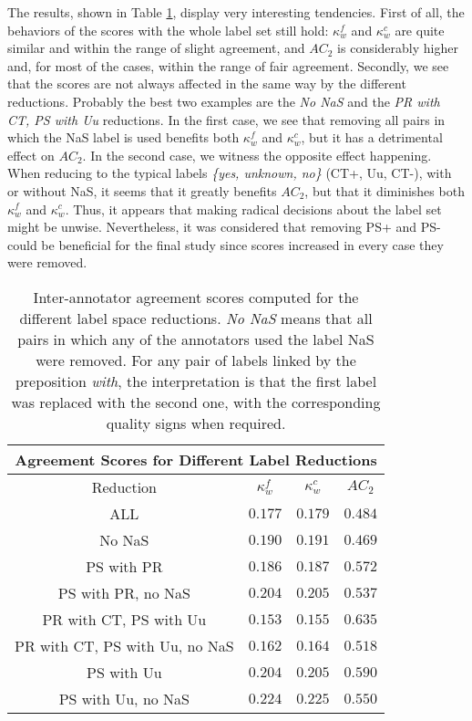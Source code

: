 The results, shown in Table \ref{tab:rediaa}, display very interesting tendencies. First of all, the behaviors of the scores with the whole label set still hold: $\kappa^{f}_{w}$ and $\kappa^{c}_{w}$ are quite similar and within the range of slight agreement, and $AC_2$ is considerably higher and, for most of the cases, within the range of fair agreement. Secondly, we see that the scores are not always affected in the same way by the different reductions. Probably the best two examples are the \textit{No NaS} and the \textit{PR with CT, PS with Uu} reductions. In the first case, we see that removing all pairs in which the NaS label is used benefits both $\kappa^{f}_{w}$ and $\kappa^{c}_{w}$, but it has a detrimental effect on $AC_2$. In the second case, we witness the opposite effect happening. When reducing to the typical labels \textit{\{yes, unknown, no\}} (CT+, Uu, CT-), with or without NaS, it seems that it greatly benefits $AC_2$, but that it diminishes both $\kappa^{f}_{w}$ and $\kappa^{c}_{w}$. Thus, it appears that making radical decisions about the label set might be unwise. Nevertheless, it was considered that removing PS+ and PS- could be beneficial for the final study since scores increased in every case they were removed.\\

\begin{table}
\centering
\begin{tabular}{|c|c|c|c|}
\hline
\multicolumn{4}{|c|}{Agreement Scores for Different Label Reductions}\\\hline
Reduction &  $\kappa^{f}_{w}$ & $\kappa^{c}_{w}$ & $AC_2$\\\hline
ALL & $0.177$ & $0.179$ & $0.484$\\\hline
No NaS & $0.190$ & $0.191$ & $0.469$ \\\hline
PS with PR & $0.186$ & $0.187$ & $0.572$\\\hline
PS with PR, no NaS & $0.204$ & $0.205$ & $0.537$\\\hline
PR with CT, PS with Uu & $0.153$ & $0.155$ & $0.635$\\\hline
PR with CT, PS with Uu, no NaS & $0.162$ & $0.164$ & $0.518$\\\hline
PS with Uu & $0.204$ & $0.205$ & $0.590$\\\hline
PS with Uu, no NaS & $0.224$ & $0.225$ & $0.550$\\\hline 
\end{tabular}
\caption[Inter-annotator agreement scores for different label reductions.]{Inter-annotator agreement scores computed for the different label space reductions. \textit{No NaS} means that all pairs in which any of the annotators used the label NaS were removed. For any pair of labels linked by the preposition \textit{with}, the interpretation is that the first label was replaced with the second one, with the corresponding quality signs when required.}
\label{tab:rediaa}
\end{table}

